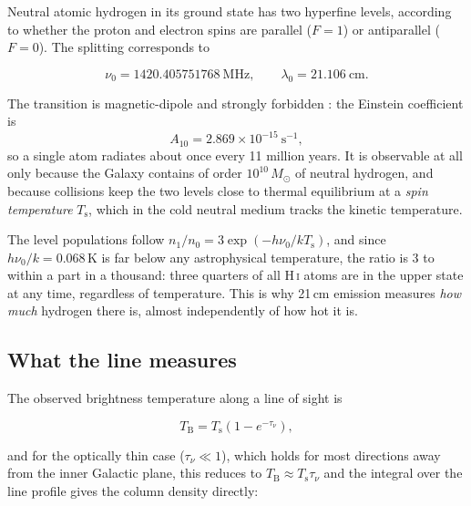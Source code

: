 \documentclass[11pt,a4paper]{article}
\begin{document}
Neutral atomic hydrogen in its ground state has two hyperfine levels, according to whether the proton and electron spins are parallel ($F=1$) or antiparallel ($F=0$). The splitting corresponds to

\begin{equation}
\nu_0 = 1420.405751768\ \text{MHz}, \qquad \lambda_0 = 21.106\ \text{cm}.
\end{equation}

The transition is magnetic-dipole and strongly forbidden \cite{ewenpurcell}: the Einstein coefficient is
\begin{equation}
A_{10} = 2.869\times10^{-15}\ \text{s}^{-1},
\end{equation}
so a single atom radiates about once every 11 million years. It is observable at all only because the Galaxy contains of order $10^{10}\,M_\odot$ of neutral hydrogen, and because collisions keep the two levels close to thermal equilibrium at a \emph{spin temperature} $T_\text{s}$, which in the cold neutral medium tracks the kinetic temperature.

The level populations follow $n_1/n_0 = 3\exp(-h\nu_0/kT_\text{s})$, and since $h\nu_0/k = 0.068$\,K is far below any astrophysical temperature, the ratio is 3 to within a part in a thousand: three quarters of all H\,\textsc{i} atoms are in the upper state at any time, regardless of temperature. This is why 21\,cm emission measures \emph{how much} hydrogen there is, almost independently of how hot it is.

\subsection{What the line measures}

The observed brightness temperature along a line of sight is

\begin{equation}
T_\text{B} = T_\text{s}\left(1 - e^{-\tau_\nu}\right),
\end{equation}

and for the optically thin case ($\tau_\nu \ll 1$), which holds for most directions away from the inner Galactic plane, this reduces to $T_\text{B} \approx T_\text{s}\tau_\nu$ and the integral over the line profile gives the column density directly:
\end{document}
